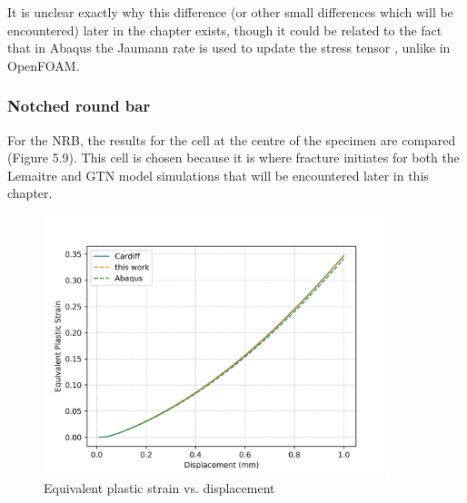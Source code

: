 \documentclass[sn-mathphys,Numbered,draft]{sn-jnl}%
\begin{document}
It is unclear exactly why this difference (or other small differences which will be encountered) later in the chapter exists, though it could be related to the fact that in Abaqus the Jaumann rate is used to update the stress tensor \cite{soyarslan_finite_2010}, unlike in OpenFOAM.

\subsubsection{Notched round bar}

For the NRB, the results for the cell at the centre of the specimen are compared (Figure 5.9). This cell is chosen because it is where fracture initiates for both the Lemaitre and GTN model simulations that will be encountered later in this chapter. 

\begin{figure}[htb]
\begin{center}
	\includegraphics[width=0.9\textwidth]{./Figures/plasticityCompare/axiCompare/disp_EpsPEq.png}
\caption{Equivalent plastic strain vs. displacement}
\label{fig:eqPlasticStrainNotchedRoundBar}
\end{center}
\end{figure}
\end{document}
